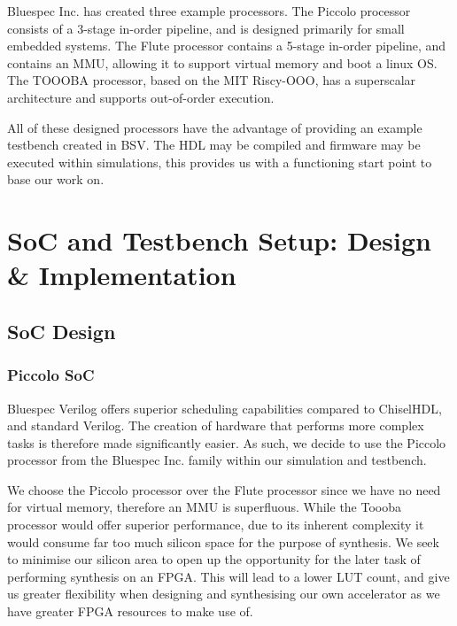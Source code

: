 \documentclass[a4paper,8pt]{report}
\begin{document}
Bluespec Inc. has created three example processors. The Piccolo processor
consists of a 3-stage in-order pipeline, and is designed primarily for small
embedded systems. The Flute processor contains a 5-stage in-order pipeline, and
contains an MMU, allowing it to support virtual memory and boot a linux OS.
The TOOOBA processor, based on the MIT Riscy-OOO, has a superscalar architecture
and supports out-of-order execution.

All of these designed processors have the advantage of providing an example
testbench created in BSV. The HDL may be compiled and firmware may be executed
within simulations, this provides us with a functioning start point to base our
work on.




\chapter{SoC and Testbench Setup: Design \& Implementation}

\section{SoC Design}
\subsection{Piccolo SoC}
Bluespec Verilog offers superior scheduling capabilities compared to ChiselHDL,
and standard Verilog. The creation of hardware that performs more complex tasks
is therefore made significantly easier. As such, we decide to use the Piccolo
processor from the Bluespec Inc. family within our simulation and testbench.

We choose the Piccolo processor over the Flute processor since we have no need
for virtual memory, therefore an MMU is superfluous. While the Toooba processor
would offer superior performance, due to its inherent complexity it would
consume far too much silicon space for the purpose of synthesis. We seek to
minimise our silicon area to open up the opportunity for the later task of
performing synthesis on an FPGA. This will lead to a lower LUT count, and give
us greater flexibility when designing and synthesising our own accelerator as we
have greater FPGA resources to make use of.
\end{document}
